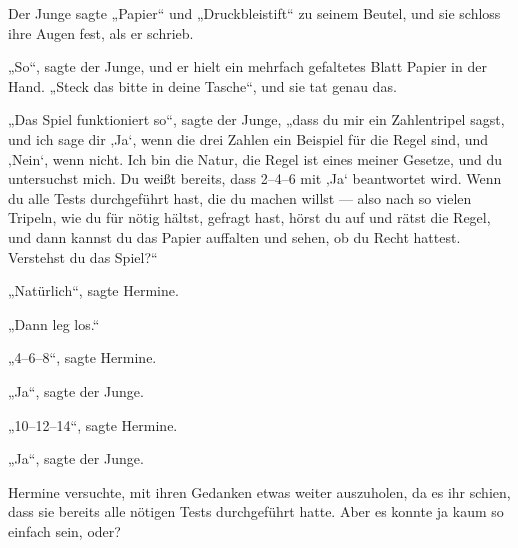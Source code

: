 Der Junge sagte
„Papier“ und
„Druckbleistift“ zu seinem Beutel, und sie schloss ihre Augen fest, als er schrieb.

„So“, sagte der Junge, und er hielt ein mehrfach gefaltetes Blatt Papier in der Hand.
„Steck das bitte in deine Tasche“, und sie tat genau das.

„Das Spiel funktioniert so“, sagte der Junge, „dass du mir ein Zahlentripel sagst, und ich sage dir ‚Ja‘, wenn die drei Zahlen ein Beispiel für die Regel sind, und ‚Nein‘, wenn nicht. Ich bin die Natur, die Regel ist eines meiner Gesetze, und du untersuchst mich. Du weißt bereits, dass 2–4–6 mit ‚Ja‘ beantwortet wird. Wenn du alle Tests durchgeführt hast, die du machen willst — also nach so vielen Tripeln, wie du für nötig hältst, gefragt hast, hörst du auf und rätst die Regel, und dann kannst du das Papier auffalten und sehen, ob du Recht hattest. Verstehst du das Spiel?“

„Natürlich“, sagte Hermine.

„Dann leg los.“

„4–6–8“, sagte Hermine.

„Ja“, sagte der Junge.

„10–12–14“, sagte Hermine.

„Ja“, sagte der Junge.

Hermine versuchte, mit ihren Gedanken etwas weiter auszuholen, da es ihr schien, dass sie bereits alle nötigen Tests durchgeführt hatte. Aber es konnte ja kaum so einfach sein, oder?

